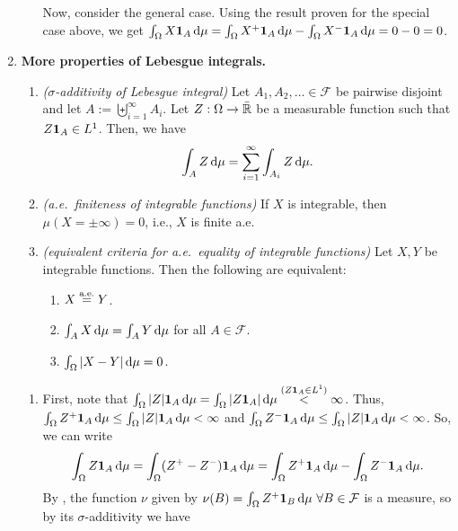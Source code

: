 \begin{enumerate}
\begin{pf}
\begin{enumerate}
Now, consider the general case. Using the result proven for the special case
above, we get \(\int_{\Omega}^{}X\indic_{A}\odif{\mu}=\int_{\Omega}^{}X^{+}\indic_{A}\odif{\mu}
-\int_{\Omega}^{}X^{-}\indic_{A}\odif{\mu}=0-0=0\).
\end{enumerate}
\end{pf}
\item \textbf{More properties of Lebesgue integrals.}
\begin{enumerate}
\item\label{it:leb-int-sig-add} \emph{(\(\sigma\)-additivity of Lebesgue integral)} Let
\(A_1,A_2,\dotsc\in\mathcal{F}\) be pairwise disjoint and let
\(A:=\biguplus_{i=1}^{\infty}A_i\). Let \(Z:\Omega\to\bar{\mathbb{R}}\) be a measurable
function such that \(Z\mathbf{1}_{A}\in L^{1}\). Then, we have
\[
\int_{A}^{}Z\odif{\mu}=\sum_{i=1}^{\infty}\int_{A_i}^{}Z\odif{\mu}.
\]
\item\label{it:leb-int-ae-fin} \emph{(a.e.\ finiteness of integrable functions)} If \(X\) is integrable,
then \(\mu(X=\pm\infty)=0\), i.e., \(X\) is finite a.e.
\item\label{it:equiv-ae-equal-int-fn} \emph{(equivalent criteria for a.e.\
equality of integrable functions)} Let \(X,Y\) be integrable functions. Then
the following are equivalent:
\begin{enumerate}
\item \(X\overset{\text{a.e.}}= Y\).
\item \(\int_{A}^{}X\odif{\mu}=\int_{A}^{}Y\odif{\mu}\) for all \(A\in\mathcal{F}\).
\item \(\int_{\Omega}^{}|X-Y|\odif{\mu}=0\).
\end{enumerate}
\end{enumerate}
\begin{pf}
\begin{enumerate}
\item First, note that \(\int_{\Omega}^{}|Z|\indic_{A}\odif{\mu}= \int_{\Omega}^{}|Z\indic_{A}|\odif{\mu}
\overset{(Z\indic_{A}\in L^{1})}{<}\infty\). Thus, \(\int_{\Omega}^{}Z^{+}\indic_{A}\odif{\mu}
\le\int_{\Omega}^{}|Z|\indic_{A}\odif{\mu}<\infty\) and
\(\int_{\Omega}^{}Z^{-}\indic_{A}\odif{\mu}
\le\int_{\Omega}^{}|Z|\indic_{A}\odif{\mu}<\infty\). So, we can write
\[
\int_{\Omega}^{}Z\indic_{A}\odif{\mu}=\int_{\Omega}^{}(Z^{+}-Z^{-})\indic_{A}\odif{\mu}
=\int_{\Omega}^{}Z^{+}\indic_{A}\odif{\mu}-\int_{\Omega}^{}Z^{-}\indic_{A}\odif{\mu}.
\]
By , the function \(\nu\) given by
\(\nu(B)=\int_{\Omega}^{}Z^{+}\indic_{B}\odif{\mu}~\forall B\in\mathcal{F}\) is
a measure, so by its \(\sigma\)-additivity we have

\end{enumerate}
\end{pf}
\end{enumerate}
